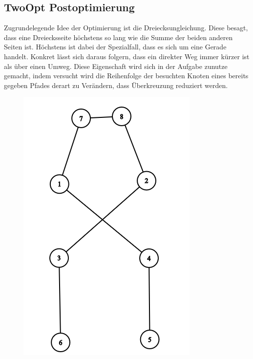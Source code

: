 \subsection{TwoOpt Postoptimierung}\label{subsec:twoopt-postoptimierung}
Zugrundelegende Idee der Optimierung ist die Dreiecksungleichung.
Diese besagt, dass eine Dreiecksseite höchstens so lang wie die Summe der beiden anderen Seiten ist.
Höchstens ist dabei der Spezialfall, dass es sich um eine Gerade handelt.
Konkret lässt sich daraus folgern, dass ein direkter Weg immer kürzer ist als über einen Umweg.
Diese Eigenschaft wird sich in der Aufgabe zunutze gemacht, indem versucht wird die Reihenfolge der besuchten Knoten eines
bereits gegeben Pfades derart zu Verändern, dass Überkreuzung reduziert werden.
\begin{figure}[h]
    \centering
    \begin{minipage}[b]{0.3\textwidth}
        \includegraphics[width=\textwidth]{2opt1}

\end{minipage}
\end{figure}
